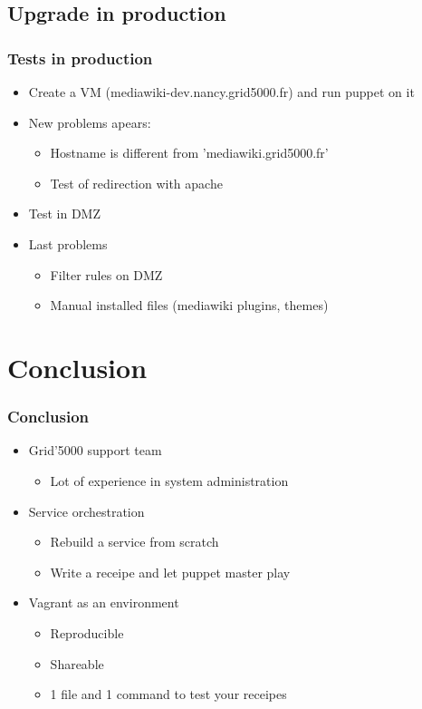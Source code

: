 \documentclass[11pt,compress]{beamer}
\begin{document}
\subsection{Upgrade in production}
\begin{frame}
\frametitle{Tests in production}
\begin{itemize}
\item Create a VM (mediawiki-dev.nancy.grid5000.fr) and run puppet on it
\item New problems apears:
\begin{itemize}
\item Hostname is different from 'mediawiki.grid5000.fr'
\item Test of redirection with apache
\end{itemize}
\item Test in DMZ
\item Last problems
\begin{itemize}
\item Filter rules on DMZ
\item Manual installed files (mediawiki plugins, themes)
\end{itemize}
\end{itemize}
\end{frame}

\section{Conclusion}
\begin{frame}
\frametitle{Conclusion}
\begin{itemize}
\item Grid'5000 support team
\begin{itemize}
\item Lot of experience in system administration
\end{itemize}
\item Service orchestration
\begin{itemize}
\item Rebuild a service from scratch
\item Write a receipe and let puppet master play
\end{itemize}
\item Vagrant as an environment
\begin{itemize}
\item Reproducible
\item Shareable
\item 1 file and 1 command to test your receipes
\end{itemize}
\end{itemize}

\end{frame}
\end{document}

